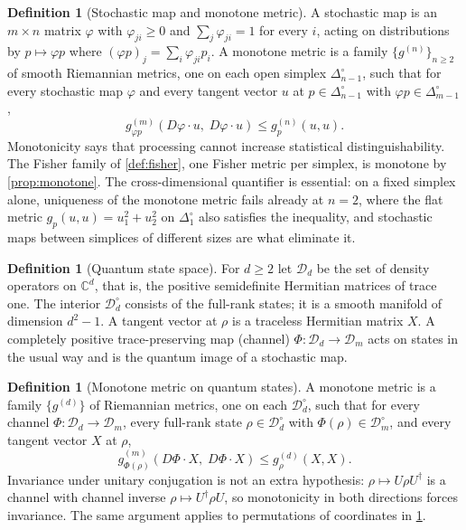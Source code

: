 \documentclass[11pt,letterpaper]{article}
\theoremstyle{definition}
\newtheorem{definition}[theorem]{Definition}
\theoremstyle{remark}
\begin{document}
\begin{definition}[Stochastic map and monotone metric]
\label{def:stochastic}
A stochastic map is an $m \times n$ matrix $\varphi$ with $\varphi_{ji} \geq 0$ and $\sum_{j} \varphi_{ji} = 1$ for every $i$, acting on distributions by $p \mapsto \varphi p$ where $(\varphi p)_j = \sum_i \varphi_{ji} p_i$. A monotone metric is a family $\{g^{(n)}\}_{n \geq 2}$ of smooth Riemannian metrics, one on each open simplex $\Delta_{n-1}^{\circ}$, such that for every stochastic map $\varphi$ and every tangent vector $u$ at $p \in \Delta_{n-1}^{\circ}$ with $\varphi p \in \Delta_{m-1}^{\circ}$,
\begin{equation}
g^{(m)}_{\varphi p}(D\varphi \cdot u, \; D\varphi \cdot u) \leq g^{(n)}_p(u, u).
\end{equation}
Monotonicity says that processing cannot increase statistical distinguishability. The Fisher family of \cref{def:fisher}, one Fisher metric per simplex, is monotone by \cref{prop:monotone}. The cross-dimensional quantifier is essential: on a fixed simplex alone, uniqueness of the monotone metric fails already at $n = 2$, where the flat metric $g_p(u,u) = u_1^2 + u_2^2$ on $\Delta_1^{\circ}$ also satisfies the inequality, and stochastic maps between simplices of different sizes are what eliminate it.
\end{definition}

\begin{definition}[Quantum state space]
\label{def:quantum-states}
For $d \geq 2$ let $\mathcal{D}_d$ be the set of density operators on $\mathbb{C}^d$, that is, the positive semidefinite Hermitian matrices of trace one. The interior $\mathcal{D}_d^{\circ}$ consists of the full-rank states; it is a smooth manifold of dimension $d^2 - 1$. A tangent vector at $\rho$ is a traceless Hermitian matrix $X$. A completely positive trace-preserving map (channel) $\Phi : \mathcal{D}_d \to \mathcal{D}_{m}$ acts on states in the usual way and is the quantum image of a stochastic map.
\end{definition}

\begin{definition}[Monotone metric on quantum states]
\label{def:quantum-monotone}
A monotone metric is a family $\{g^{(d)}\}$ of Riemannian metrics, one on each $\mathcal{D}_d^{\circ}$, such that for every channel $\Phi : \mathcal{D}_d \to \mathcal{D}_m$, every full-rank state $\rho \in \mathcal{D}_d^{\circ}$ with $\Phi(\rho) \in \mathcal{D}_m^{\circ}$, and every tangent vector $X$ at $\rho$,
\begin{equation}
g^{(m)}_{\Phi(\rho)}(D\Phi \cdot X, \; D\Phi \cdot X) \leq g^{(d)}_{\rho}(X, X).
\end{equation}
Invariance under unitary conjugation is not an extra hypothesis: $\rho \mapsto U \rho U^{\dagger}$ is a channel with channel inverse $\rho \mapsto U^{\dagger} \rho U$, so monotonicity in both directions forces invariance. The same argument applies to permutations of coordinates in \cref{def:stochastic}.
\end{definition}
\end{document}
